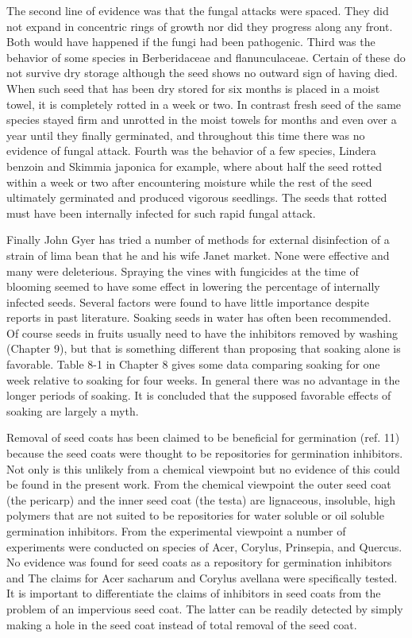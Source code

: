 The second line of evidence was that the fungal attacks were spaced. They did
not expand in concentric rings of growth nor did they progress along any front. Both
would have happened if the fungi had been pathogenic. Third was the behavior of
some species in Berberidaceae and flanunculaceae. Certain of these do not survive
dry storage although the seed shows no outward sign of having died. When such
seed that has been dry stored for six months is placed in a moist towel, it is completely
rotted in a week or two. In contrast fresh seed of the same species stayed firm and
unrotted in the moist towels for months and even over a year until they finally
germinated, and throughout this time there was no evidence of fungal attack. Fourth
was the behavior of a few species, Lindera benzoin and Skimmia japonica for
example, where about half the seed rotted within a week or two after encountering
moisture while the rest of the seed ultimately germinated and produced vigorous
seedlings. The seeds that rotted must have been internally infected for such rapid
fungal attack.

Finally John Gyer has tried a number of methods for external disinfection of a
strain of lima bean that he and his wife Janet market. None were effective and many
were deleterious. Spraying the vines with fungicides at the time of blooming seemed
to have some effect in lowering the percentage of internally infected seeds.
Several factors were found to have little importance despite reports in past
literature. Soaking seeds in water has often been recommended. Of course seeds in
fruits usually need to have the inhibitors removed by washing (Chapter 9), but that is
something different than proposing that soaking alone is favorable. Table 8-1 in
Chapter 8 gives some data comparing soaking for one week relative to soaking for
four weeks. In general there was no advantage in the longer periods of soaking. It is
concluded that the supposed favorable effects of soaking are largely a myth.

Removal of seed coats has been claimed to be beneficial for germination (ref.
11) because the seed coats were thought to be repositories for germination inhibitors.
Not only is this unlikely from a chemical viewpoint but no evidence of this could be
found in the present work. From the chemical viewpoint the outer seed coat (the
pericarp) and the inner seed coat (the testa) are lignaceous, insoluble, high polymers
that are not suited to be repositories for water soluble or oil soluble germination
inhibitors. From the experimental viewpoint a number of experiments were conducted
on species of Acer, Corylus, Prinsepia, and Quercus. No evidence was found for seed
coats as a repository for germination inhibitors and The claims for Acer sacharum and
Corylus avellana were specifically tested. It is important to differentiate the claims of
inhibitors in seed coats from the problem of an impervious seed coat. The latter can
be readily detected by simply making a hole in the seed coat instead of total removal
of the seed coat.

